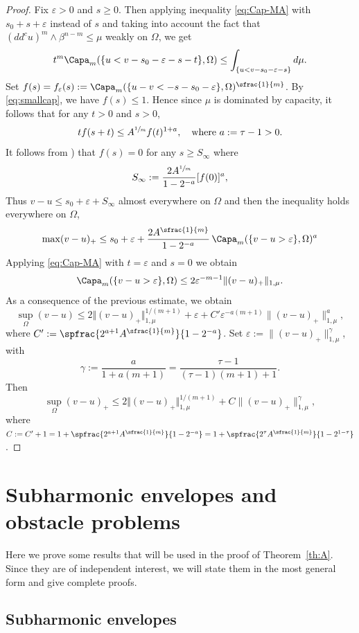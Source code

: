 \begin{proof}
Fix $\varepsilon > 0$ and $s \geq 0$. Then applying inequality \eqref{eq:Cap-MA} with $s_0 + s + \varepsilon$ instead of $s$ and taking into account the fact that $(dd^c u)^m \wedge \beta^{n - m} \leq \mu$ weakly on $\Omega$, we get
\begin{equation} \label{eq:cap-mu}
t^m \Capa_m(\{u< v - s_0 - \varepsilon - s -t\},\Omega)\leq \int_{\{u<v -s_0 - \varepsilon - s\}} d \mu.
\end{equation}
Set $ f (s) = f_\varepsilon (s):=\Capa_m(\{u-v<-s - s_0 -\varepsilon\},\Omega)^{\sfrac{1}{m}}$. By \eqref{eq:smallcap}, we have $f (s) \leq 1$. Hence since $\mu$ is dominated by capacity, it follows that for any $t > 0$ and $s > 0$,
\[
t f (s + t) \leq A^{\sfrac{1}{m}} f (t)^{1 + a}, \quad \text{where } a:= \tau - 1 > 0.
\]
It follows from \cite[Lem.\,2.4]{EGZ09}) that $f (s) = 0$ for any $s\geq S_\infty$ where
\[
S_\infty:=\frac{2 A^{\sfrac{1}{m}} }{1-2^{-a}} [f (0)]^{a},
\]
Thus $v-u\leq s_0 + \varepsilon + S_\infty$ almost everywhere on $\Omega$ and then the inequality holds everywhere on $\Omega$, \ie
\[
\max (v-u)_+ \leq s_ 0 + \varepsilon + \frac{2 A^{\sfrac{1}{m}}}{1-2^{-a}}\, \Capa_m(\{v - u >\varepsilon\},\Omega)^{a}
\]
Applying \eqref{eq:Cap-MA} with $t=\varepsilon$ and $s = 0$ we obtain
\[
\Capa_m(\{v - u > \varepsilon\},\Omega)\leq 2 \varepsilon^{-m-1}\|(v-u)_+\|_{1,\mu}.
\]
As a consequence of the previous estimate, we obtain
\[
\sup_\Omega(v-u)\leq 2 \Vert (v-u)_+\Vert_{1,\mu}^{1 \slash (m+1)} + \varepsilon+ C' \varepsilon^{-a (m+1)}\|(v-u)_+\|^{a}_{1,\mu},
\]
where $C':= \spfrac{2^{a + 1} A^{\sfrac{1}{m}}}{1-2^{-a}}$.
Set $\varepsilon:=\|(v-u)_+\|^\gamma_{1,\mu}$, with
\[
\gamma:=\frac{a}{1 +a(m+1)} = \frac{\tau - 1}{(\tau - 1) (m + 1) + 1}.
\]
Then
\[
\sup_{\Omega}(v-u)_+\leq 2 \Vert (v-u)_+\Vert_{1,\mu}^{1 \slash (m+1)} + C \|(v-u)_+\|^\gamma_{1,\mu},
\]
where $C:= C' + 1 = 1 + \spfrac{2^{a + 1} A^{\sfrac{1}{m}}}{1-2^{-a}} = 1 + \spfrac{2^{\tau} A^{\sfrac{1}{m}}}{1-2^{1 -\tau}}$.
\end{proof}

\section{Subharmonic envelopes and obstacle problems}\label{sec:3}
Here we prove some results that will be used in the proof of Theorem~\ref{th:A}. Since they are of independent interest, we will state them in the most general form and give complete proofs.

\subsection{Subharmonic envelopes }

